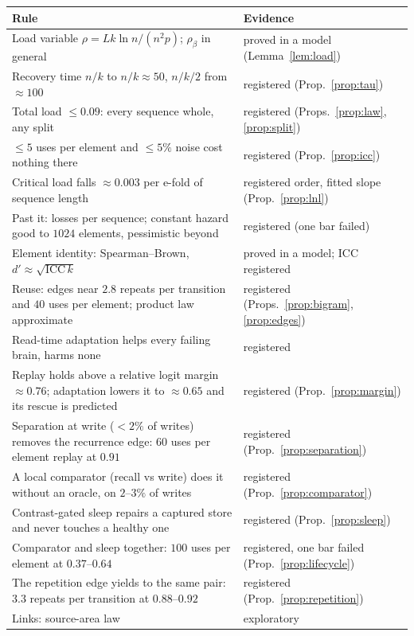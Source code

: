 \documentclass[11pt]{article}
\theoremstyle{definition}
\theoremstyle{plain}
\begin{document}
\begin{center}
\begin{tabular}{p{}p{}}
\toprule
Rule & Evidence \\
\midrule
Load variable $\rho = Lk\ln n/(n^2p)$; $\rho_\beta$ in general & proved in a model (Lemma~\ref{lem:load}) \\
Recovery time $n/k$ to $n/k \approx 50$, $n/k/2$ from $\approx 100$ & registered (Prop.~\ref{prop:tau}) \\
Total load $\le 0.09$: every sequence whole, any split & registered (Props.~\ref{prop:law}, \ref{prop:split}) \\
$\le 5$ uses per element and $\le 5\%$ noise cost nothing there & registered (Prop.~\ref{prop:icc}) \\
Critical load falls $\approx 0.003$ per e-fold of sequence length & registered order, fitted slope (Prop.~\ref{prop:lnl}) \\
Past it: losses per sequence; constant hazard good to $1024$ elements, pessimistic beyond & registered (one bar failed) \\
Element identity: Spearman--Brown, $d' \approx \sqrt{\mathrm{ICC}\,k}$ & proved in a model; ICC registered \\
Reuse: edges near $2.8$ repeats per transition and $40$ uses per element; product law approximate & registered (Props.~\ref{prop:bigram}, \ref{prop:edges}) \\
Read-time adaptation helps every failing brain, harms none & registered \\
Replay holds above a relative logit margin $\approx 0.76$; adaptation lowers it to $\approx 0.65$ and its rescue is predicted & registered (Prop.~\ref{prop:margin}) \\
Separation at write ($<2\%$ of writes) removes the recurrence edge: $60$ uses per element replay at $0.91$ & registered (Prop.~\ref{prop:separation}) \\
A local comparator (recall vs write) does it without an oracle, on $2$--$3\%$ of writes & registered (Prop.~\ref{prop:comparator}) \\
Contrast-gated sleep repairs a captured store and never touches a healthy one & registered (Prop.~\ref{prop:sleep}) \\
Comparator and sleep together: $100$ uses per element at $0.37$--$0.64$ & registered, one bar failed (Prop.~\ref{prop:lifecycle}) \\
The repetition edge yields to the same pair: $3.3$ repeats per transition at $0.88$--$0.92$ & registered (Prop.~\ref{prop:repetition}) \\
Links: source-area law & exploratory \\
\bottomrule
\end{tabular}
\end{center}
\end{document}
